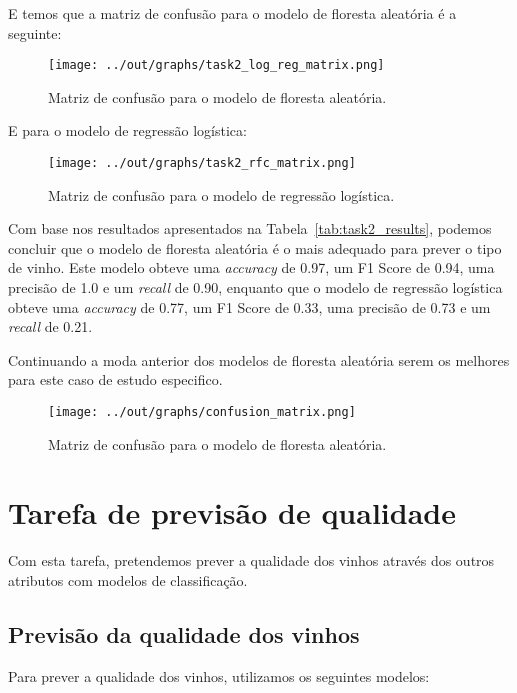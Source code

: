 \documentclass{article}
\begin{document}
E temos que a matriz de confusão para o modelo de floresta aleatória é a seguinte:

\begin{figure}[ht]
  \centering
  \texttt{[image: ../out/graphs/task2\_log\_reg\_matrix.png]}
  \caption{Matriz de confusão para o modelo de floresta aleatória.}
  \label{fig:task2_confusion_matrix}
\end{figure}

E para o modelo de regressão logística:

\begin{figure}[ht]
  \centering
  \texttt{[image: ../out/graphs/task2\_rfc\_matrix.png]}
  \caption{Matriz de confusão para o modelo de regressão logística.}
  \label{fig:task2_confusion_matrix}
\end{figure}

Com base nos resultados apresentados na Tabela~\ref{tab:task2_results}, podemos concluir que o modelo de floresta aleatória é o mais adequado para prever o tipo de vinho. Este modelo obteve uma \textit{accuracy} de 0.97, um F1 Score de 0.94, uma precisão de 1.0 e um \textit{recall} de 0.90, enquanto que o modelo de regressão logística obteve uma \textit{accuracy} de 0.77, um F1 Score de 0.33, uma precisão de 0.73 e um \textit{recall} de 0.21.

Continuando a moda anterior dos modelos de floresta aleatória serem os melhores para este caso de estudo especifico.

\begin{figure}[ht]
  \centering
  \texttt{[image: ../out/graphs/confusion\_matrix.png]}
  \caption{Matriz de confusão para o modelo de floresta aleatória.}
  \label{fig:task2_confusion_matrix}
\end{figure}

\section{Tarefa de previsão de qualidade}

Com esta tarefa, pretendemos prever a qualidade dos vinhos através dos outros atributos com modelos de classificação.

\subsection{Previsão da qualidade dos vinhos}

Para prever a qualidade dos vinhos, utilizamos os seguintes modelos:
\end{document}
